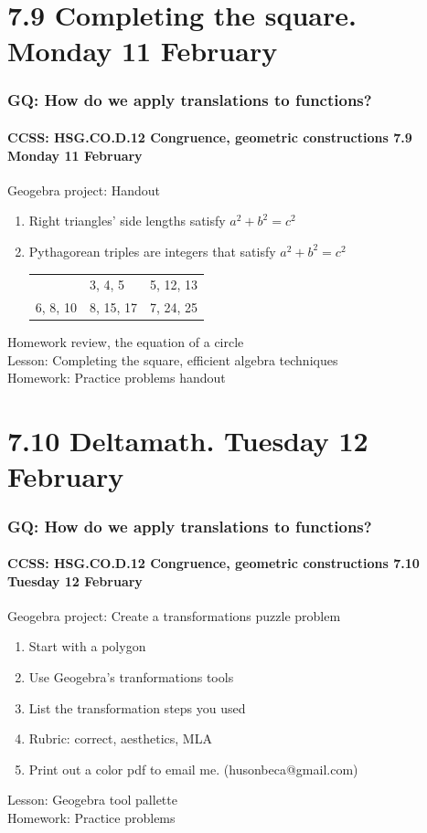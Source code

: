 \documentclass{beamer}
\begin{document}
\section{7.9 Completing the square. Monday 11 February}
  \frame
  {
    \frametitle{GQ: How do we apply translations to functions?}
    \framesubtitle{CCSS: HSG.CO.D.12 Congruence, geometric constructions \hfill \alert{7.9 Monday 11 February}}

    \begin{block}{Geogebra project: Handout}
      \begin{enumerate}
        \item Right triangles' side lengths satisfy $a^2+b^2=c^2$
        \item Pythagorean triples are integers that satisfy $a^2+b^2=c^2$\\
        \begin{tabular}{lll}
          & 3, 4, 5 &  5, 12, 13 \\
          6, 8, 10 & 8, 15, 17 & 7, 24, 25
        \end{tabular}
      \end{enumerate}
    \end{block}
    Homework review, the equation of a circle\\
    Lesson: Completing the square, efficient algebra techniques\\[0.5cm]
    Homework: Practice problems handout
  }

\section{7.10 Deltamath. Tuesday 12 February}
  \frame
  {
    \frametitle{GQ: How do we apply translations to functions?}
    \framesubtitle{CCSS: HSG.CO.D.12 Congruence, geometric constructions \hfill \alert{7.10 Tuesday 12 February}}

    \begin{block}{Geogebra project: Create a transformations puzzle problem}
      \begin{enumerate}
        \item Start with a polygon
        \item Use Geogebra's tranformations tools
        \item List the transformation steps you used
        \item Rubric: correct, aesthetics, MLA
        \item Print out a color pdf to email me. (husonbeca@gmail.com)
      \end{enumerate}
    \end{block}
    Lesson: Geogebra tool pallette\\[0.5cm]
    Homework: Practice problems
  }
\end{document}
